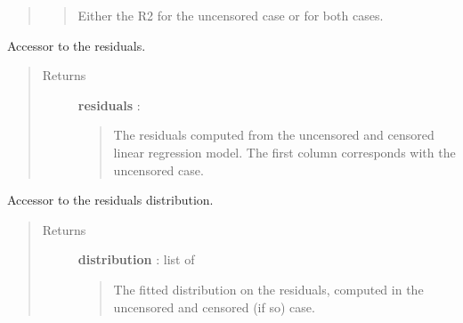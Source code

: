 \documentclass[letterpaper,10pt,english]{sphinxmanual}
\begin{document}
\begin{fulllineitems}
\begin{fulllineitems}
\begin{quote}
\begin{description}
\begin{quote}
Either the R2 for the uncensored case or for both cases.
\end{quote}

\end{description}\end{quote}

\end{fulllineitems}


\begin{fulllineitems}
\label{_generated/otpod.UnivariateLinearModelAnalysis:otpod.UnivariateLinearModelAnalysis.getResiduals}
Accessor to the residuals.
\begin{quote}\begin{description}
\item[{Returns}] \leavevmode
\textbf{residuals} : \href{http://doc.openturns.org/openturns-latest/sphinx/user\_manual/\_generated/openturns.NumericalSample.html\#openturns.NumericalSample}{}
\begin{quote}

The residuals computed from the uncensored and censored linear
regression model. The first column corresponds with the uncensored case.
\end{quote}

\end{description}\end{quote}

\end{fulllineitems}


\begin{fulllineitems}
\label{_generated/otpod.UnivariateLinearModelAnalysis:otpod.UnivariateLinearModelAnalysis.getResidualsDistribution}
Accessor to the residuals distribution.
\begin{quote}\begin{description}
\item[{Returns}] \leavevmode
\textbf{distribution} : list of \href{http://doc.openturns.org/openturns-latest/sphinx/user\_manual/\_generated/openturns.Distribution.html\#openturns.Distribution}{}
\begin{quote}

The fitted distribution on the residuals, computed in the uncensored
and censored (if so) case.
\end{quote}


\end{description}
\end{quote}
\end{fulllineitems}
\end{fulllineitems}
\end{document}
